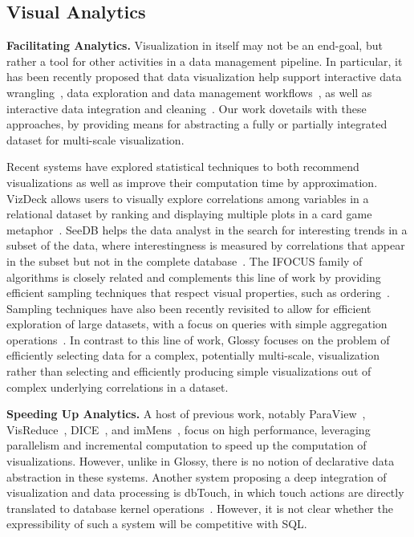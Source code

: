 \documentclass[11pt, oneside]{report}
\newcommand{\minisec}[1]{\noindent\textbf{#1.}}
\begin{document}
{\subsection{Visual Analytics}
\label{sec:related:analytics}

\minisec{Facilitating Analytics}
Visualization in itself may not be an end-goal, but rather a tool for other activities in a data management pipeline. In particular, it has been recently proposed that data visualization help support interactive data wrangling~\cite{KandelPHH11:Wrangler}, data exploration and data management workflows~\cite{BavoilCSVCSF05:VisTrails,FeketeS12:DMVisChallenges}, as well as interactive data integration and cleaning~\cite{MortonBGM14:VisClean}. Our work dovetails with these approaches, by providing means for abstracting a fully or partially integrated dataset for multi-scale visualization.    

Recent systems have explored statistical techniques to both recommend visualizations as well as improve their computation time by approximation. VizDeck allows users to visually explore correlations among variables in a relational dataset by ranking and displaying multiple plots in a card game metaphor~\cite{KeyHPA12:VizDeck}. SeeDB helps the data analyst in the search for interesting trends in a subset of the data, where interestingness is measured by correlations that appear in the subset but not in the complete database~\cite{vartak:seedb}. The IFOCUS family of algorithms is closely related and complements this line of work by providing efficient sampling techniques that respect visual properties, such as ordering~\cite{blais:generating}. Sampling techniques have also been recently revisited to allow for efficient exploration of large datasets, with a focus on queries with simple aggregation operations~\cite{Agarwal:2014:blink,NirkhiwaleDJ13:sampling,SidirourgosKB11:SciBORQ}.  In contrast to this line of work, Glossy focuses on the problem of efficiently selecting data for a complex, potentially multi-scale, visualization rather than selecting and efficiently producing simple visualizations out of complex underlying correlations in a dataset. 

\minisec{Speeding Up Analytics}
A host of previous work, notably ParaView~\cite{HendersonAL04:ParaView}, VisReduce~\cite{ImVM13:VisReduce}, DICE~\cite{KamatJTN14:CubeExploration}, and imMens~\cite{LiuJH13:imMens}, focus on high performance, leveraging parallelism and incremental computation to speed up the computation of visualizations. However, unlike in Glossy, there is no notion of declarative data abstraction in these systems. Another system proposing a deep integration of visualization and data processing is dbTouch, in which touch actions are directly translated to database kernel operations~\cite{IdreosL13:dbTouch}. However, it is not clear whether the expressibility of such a system will be competitive with SQL.\newline

}
\end{document}
